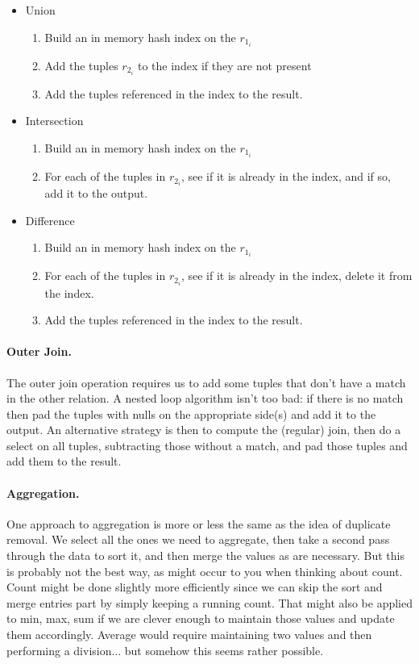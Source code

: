 \begin{itemize}
	\item Union
	\begin{enumerate}
		\item Build an in memory hash index on the $r_{1_{i}}$
		\item Add the tuples $r_{2_{i}}$ to the index if they are not present
		\item Add the tuples referenced in the index to the result.
	\end{enumerate}
	
	\item Intersection
	\begin{enumerate}
		\item Build an in memory hash index on the $r_{1_{i}}$
		\item For each of the tuples in $r_{2_{i}}$, see if it is already in the index, and if so, add it to the output.
	\end{enumerate}
	
	\item Difference
	\begin{enumerate}
		\item Build an in memory hash index on the $r_{1_{i}}$
		\item For each of the tuples in $r_{2_{i}}$, see if it is already in the index, delete it from the index.
		\item Add the tuples referenced in the index to the result.
	\end{enumerate}

\end{itemize}

\paragraph{Outer Join.}
The outer join operation requires us to add some tuples that don't have a match in the other relation. A nested loop algorithm isn't too bad: if there is no match then pad the tuples with nulls on the appropriate side(s) and add it to the output. An alternative strategy is then to compute the (regular) join, then do a select on all tuples, subtracting those without a match, and pad those tuples and add them to the result.

\paragraph{Aggregation.} One approach to aggregation is more or less the same as the idea of duplicate removal. We select all the ones we need to aggregate, then take a second pass through the data to sort it, and then merge the values as are necessary. But this is probably not the best way, as might occur to you when thinking about count. Count might be done slightly more efficiently since we can skip the sort and merge entries part by simply keeping a running count. That might also be applied to min, max, sum if we are clever enough to maintain those values and update them accordingly. Average would require maintaining two values and then performing a division... but somehow this seems rather possible.

